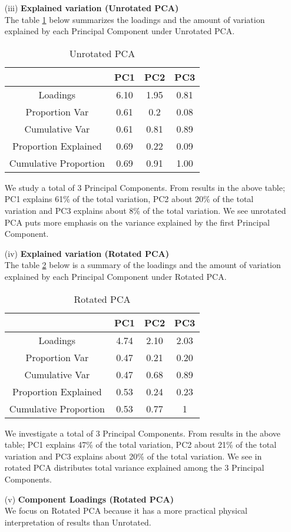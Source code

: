 \documentclass[12pt,a4paper]{article}
\begin{document}
\begin{enumerate}
\item[(iii)]\textbf{Explained variation (Unrotated PCA)}\\
The table \ref{7} below summarizes the loadings and the amount of variation explained by each Principal Component under Unrotated PCA.
\begin{table}[H]
    \centering
    \begin{tabular}{|c|c|c|c|}
    \hline
    & PC1&PC2&PC3\\
    \hline
       Loadings & 6.10& 1.95& 0.81  \\
      Proportion Var &  0.61 &  0.2& 0.08 \\
     Cumulative Var & 0.61 &  0.81 & 0.89\\
       Proportion Explained  &    0.69 & 0.22  & 0.09 \\
      Cumulative Proportion   &   0.69 & 0.91 & 1.00\\
        \hline
    \end{tabular}
    \caption{Unrotated PCA}
    \label{7}
\end{table}
We study a total of 3 Principal Components. From results in the above table;
PC1 explains 61\% of the total variation, PC2 about  20\% of the total variation and PC3 explains about 8\% of the total variation.
We see unrotated PCA puts more emphasis on the variance explained by the first Principal Component.
\item[(iv)]\textbf{Explained variation (Rotated PCA)}\\
The table \ref{8} below is a summary of the loadings and the amount of variation explained by each Principal Component under Rotated PCA.
\begin{table}[H]
    \centering
    \begin{tabular}{|c|c|c|c|}
    \hline
    & PC1&PC2&PC3\\
    \hline
       Loadings & 4.74& 2.10& 2.03  \\
      Proportion Var &  0.47 &  0.21& 0.20 \\
     Cumulative Var & 0.47 &  0.68 & 0.89\\
       Proportion Explained  &    0.53 & 0.24  & 0.23 \\
      Cumulative Proportion   &   0.53 & 0.77 & 1\\
        \hline
     \end{tabular}
  \caption{Rotated PCA}
  \label{8}
\end{table}
We investigate a total of 3 Principal Components. From results in the above table;
PC1 explains 47\% of the total variation, PC2 about  21\% of the total variation and PC3 explains about 20\% of the total variation.
We see in rotated PCA distributes total variance explained among the 3 Principal Components.
\item[(v)]\textbf{Component Loadings (Rotated PCA)}\\
We focus on Rotated PCA because it has a more practical physical interpretation of results than Unrotated.


\end{enumerate}
\end{document}
